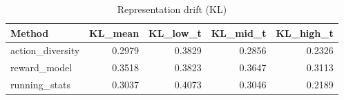 \begin{table}[htbp]
\centering
\caption{Representation drift (KL)}
\label{tab:repr-drift}
\begin{tabular}{lrrrr}
\toprule
\textbf{Method} & \textbf{KL\_mean} & \textbf{KL\_low\_t} & \textbf{KL\_mid\_t} & \textbf{KL\_high\_t} \\
\midrule
action\_diversity & 0.2979 & 0.3829 & 0.2856 & 0.2326 \\
reward\_model & 0.3518 & 0.3823 & 0.3647 & 0.3113 \\
running\_stats & 0.3037 & 0.4073 & 0.3046 & 0.2189 \\
\bottomrule
\end{tabular}
\end{table}